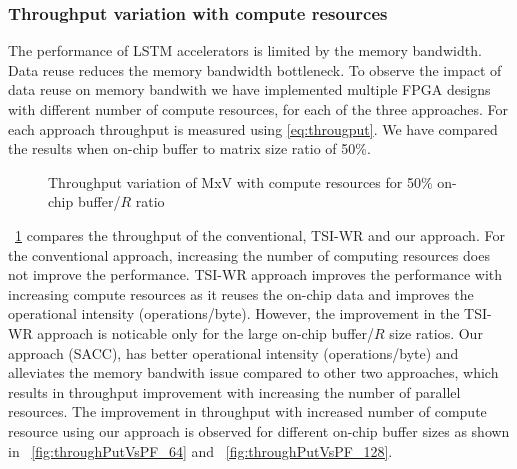 {{{{\subsubsection{Throughput variation with compute resources}
The performance of LSTM accelerators is limited by the memory bandwidth. Data reuse reduces the memory bandwidth bottleneck. To observe the impact of data reuse on memory bandwith we have implemented multiple FPGA designs with different number of compute resources, for each of the three approaches. For each approach throughput is measured using \eqref{eq:througput}. We have compared the results when on-chip buffer to matrix size ratio of 50\%. 
\begin{figure}[htb!]
	\centering
	\hspace{2.0em}
	\caption{Throughput variation of MxV with compute resources for 50\% on-chip buffer/$R$ ratio}	\label{fig:throughputVsPF}
\end{figure}

\figurename{~\ref{fig:throughputVsPF}} compares the throughput of the conventional, TSI-WR and our approach. 
For the conventional approach, increasing the number of computing resources does not improve the performance. TSI-WR approach improves the performance with increasing compute resources as it reuses the on-chip data and improves the operational intensity (operations/byte). However, the improvement in the TSI-WR approach is noticable only for the large on-chip buffer/$R$ size ratios. Our approach (SACC), has better operational intensity (operations/byte) and alleviates the memory bandwith issue compared to other two approaches, which results in throughput improvement with increasing the number of parallel resources. The improvement in throughput with increased number of compute resource using our approach is observed for different on-chip buffer sizes as shown in \figurename{~\ref{fig:throughPutVsPF_64}} and \figurename{~\ref{fig:throughPutVsPF_128}}.
}}}}
